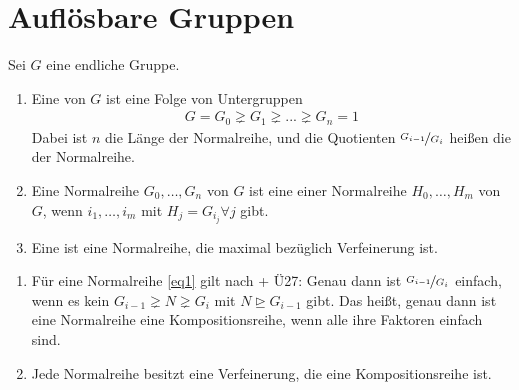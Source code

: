 \section{Auflösbare Gruppen}

Sei $G$ eine endliche Gruppe.

\begin{definition}
	\begin{enumerate}[label=(\alph*)]
		\item Eine  von $G$ ist eine Folge von Untergruppen
		\begin{align}
		\label{eq1}
		G = G_0 \gneq G_1 \gneq ... \gneq G_n = 1 %
		\end{align}
		Dabei ist $n$ die Länge der Normalreihe, und die Quotienten $\nicefrac{G_{i-1}}{G_i}$ heißen die  der Normalreihe.
		\item Eine Normalreihe $G_0, \dots, G_n$ von $G$ ist eine  einer Normalreihe $H_0,\dots,H_m$  von $G$, wenn $i_1,\dots,i_m$ mit $H_j = G_{i_{j}} \forall j$ gibt.
		\item Eine  ist eine Normalreihe, die maximal bezüglich Verfeinerung ist.
	\end{enumerate}
\end{definition}

\begin{remark}
	\begin{enumerate}[label=(\alph*)]
		\item Für eine Normalreihe \eqref{eq1} gilt nach  + Ü27:
		Genau dann ist $\nicefrac{G_{i-1}}{G_i}$ einfach, wenn es kein $G_{i-1} \gneq N \gneq G_i$ mit $N \unrhd G_{i-1}$ gibt. Das heißt, genau dann ist eine Normalreihe eine Kompositionsreihe, wenn alle ihre Faktoren einfach sind. %
		\item Jede Normalreihe besitzt eine Verfeinerung, die eine Kompositionsreihe ist.
	\end{enumerate}
\end{remark}

